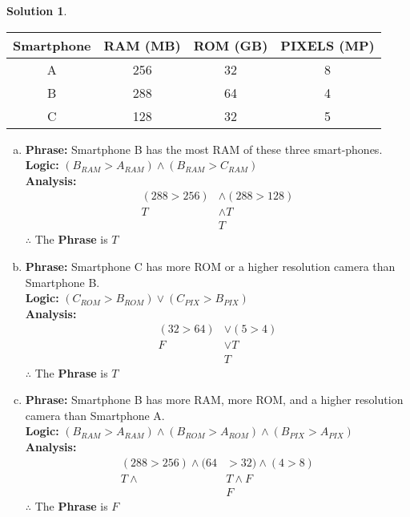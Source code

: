 \documentclass{article}
\theoremstyle{definition}
\newtheorem*{solution}{Solution}
\begin{document}
\begin{solution} \ \\
  \begin{center}
      \begin{tabular}{|c||c|c|c|}
        \hline
         Smartphone & RAM (MB) & ROM (GB) & PIXELS (MP) \\
         \hline
         A & 256 & 32 & 8 \\
         \hline
         B & 288 & 64 & 4 \\
         \hline
         C & 128 & 32 & 5 \\
         \hline
      \end{tabular}
    \end{center}
    
    \begin{enumerate}[(a)]
      \item \textbf{Phrase:} Smartphone B has the most RAM of these three smart-phones. \\
        \textbf{Logic:} $(B_{RAM} > A_{RAM}) \wedge (B_{RAM} > C_{RAM})$ \\
        \textbf{Analysis:} 
        \begin{align*}
          (288 > 256) & \wedge (288 > 128) \\
          T & \wedge T \\
          &T
        \end{align*}
        $\therefore$ The \textbf{Phrase} is $T$
          
      \item \textbf{Phrase:} Smartphone C has more ROM or a higher resolution camera than Smartphone B. \\
        \textbf{Logic:} $(C_{ROM} > B_{ROM}) \lor (C_{PIX} > B_{PIX})$ \\
        \textbf{Analysis:} 
        \begin{align*}
          (32 > 64) & \lor (5 > 4) \\
          F & \lor T \\
          &T
        \end{align*}
        $\therefore$ The \textbf{Phrase} is $T$
      
      \item \textbf{Phrase:} Smartphone B has more RAM, more ROM, and a higher resolution camera than Smartphone A. \\
        \textbf{Logic:} $(B_{RAM} > A_{RAM}) \land (B_{ROM} > A_{ROM}) \land (B_{PIX} > A_{PIX})$ \\
        \textbf{Analysis:} 
        \begin{align*}
          (288 > 256) \wedge (64 &> 32) \land (4 > 8) \\
          T \land &T \land F \\
          &F
        \end{align*}
        $\therefore$ The \textbf{Phrase} is $F$
      

\end{enumerate}
\end{solution}
\end{document}
